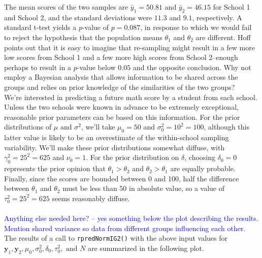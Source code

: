 \documentclass[12pt, a4paper]{article}
\begin{document}
\noindent The mean scores of the two samples are $\bar{y}_1 = 50.81$ and $\bar{y}_2 = 46.15$ for School 1 and School 2, and the standard deviations were $11.3$ and $9.1$, respectively.  A standard t-test yields a $p$-value of $p = 0.087$, in response to which we would fail to reject the hypothesis that the population means $\theta_1$ and $\theta_2$ are different. Hoff points out that it is easy to imagine that re-sampling might result in a few more low scores from School 1 and a few more high scores from School 2--enough perhaps to result in a $p$-value below $0.05$ and the opposite conclusion. Why not employ a Bayesian analysis that allows information to be shared across the groups and relies on prior knowledge of the similarities of the two groups?\\

\noindent We're interested in predicting a future math score by a student from each school.  Unless the two schools were known in advance to be extremely exceptional, reasonable prior parameters can be based on this information.  For the prior distributions of $\mu$ and $\sigma^2$, we'll take $\mu_0 = 50$ and $\sigma^2_0 = 10^2 = 100$, although this latter value is likely to be an overestimate of the within-school sampling variability.  We'll make these prior distributions somewhat diffuse, with $\gamma^2_0 = 25^2 = 625$ and $\nu_0 = 1$.  For the prior distribution on $\delta$, choosing $\delta_0 = 0$ represents the prior opinion that $\theta_1 > \theta_2$ and $\theta_2 > \theta_1$ are equally probable.  Finally, since the scores are bounded between 0 and 100, half the difference between $\theta_1$ and $\theta_2$ must be less than 50 in absolute value, so a value of $\tau^2_0 = 25^2 = 625$ seems reasonably diffuse.\\\\

\textcolor{blue}{Anything else needed here? -- yes something below the plot describing the results.  Mention shared variance so data from different groups influencing each other.}
      The results of a call to \texttt{rpredNormIG2()} with the above input values for $\mathbf{y}_1,\mathbf{y}_2,\mu_0,\sigma^2_0,\delta_0,\tau^2_0,\text{ and } N$ are summarized in the following plot.\\
\end{document}
